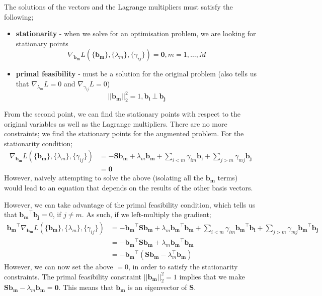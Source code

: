 \documentclass[a4paper, 12pt]{article}
\newcommand{\summation}[2]{\sum\limits_{#1}^{#2}}
\newcommand{\mat}[1]{\boldsymbol{#1}}
\renewcommand{\vec}[1]{\boldsymbol{#1}}
\begin{document}
            The solutions of the vectors and the Lagrange multipliers must satisfy the following;
            \begin{itemize}
                \itemsep0em
                \item \textbf{stationarity} - when we solve for an optimisation problem, we are looking for stationary points
                    $$\nabla_{\vec{b_m}} L(\{ \vec{b_m} \}, \{ \lambda_m \}, \{ \gamma_{ij} \}) = \vec{0}, m = 1, \dots, M$$
                \item \textbf{primal feasibility} - must be a solution for the original problem (also tells us that $\nabla_{\lambda_m}L = 0$ and $\nabla_{\gamma_{ij}}L = 0$)
                    $$|| \vec{b_m} ||_2^2 = 1, \vec{b_i}\ \bot\ \vec{b_j}$$
            \end{itemize}
            From the second point, we can find the stationary points with respect to the original variables as well as the Lagrange multipliers.
            There are no more constraints; we find the stationary points for the augmented problem.
            For the stationarity condition;
            \begin{align*}
                \nabla_{\vec{b_m}} L(\{ \vec{b_m} \}, \{ \lambda_m \}, \{ \gamma_{ij} \}) & = -\mat{S}\vec{b_m} + \lambda_m\vec{b_m} + \summation{i < m}{} \gamma_{im} \vec{b_i} + \summation{j > m}{} \gamma_{mj} \vec{b_j} \\
                & = \vec{0}
            \end{align*}
            However, naively attempting to solve the above (isolating all the $\vec{b_m}$ terms) would lead to an equation that depends on the results of the other basis vectors.
            \medskip

            However, we can take advantage of the primal feasibility condition, which tells us that $\vec{b_m}^\top\vec{b_j} = 0$, if $j \neq m$.
            As such, if we left-multiply the gradient;
            \begin{align*}
                \vec{b_m}^\top \nabla_{\vec{b_m}} L(\{ \vec{b_m} \}, \{ \lambda_m \}, \{ \gamma_{ij} \}) & = -\vec{b_m}^\top\mat{S}\vec{b_m} + \lambda_m\vec{b_m}^\top\vec{b_m} + \summation{i < m}{} \gamma_{im} \vec{b_m}^\top\vec{b_i} + \summation{j > m}{} \gamma_{mj} \vec{b_m}^\top\vec{b_j} \\
                & = -\vec{b_m}^\top\mat{S}\vec{b_m} + \lambda_m\vec{b_m}^\top\vec{b_m} \\
                & = -\vec{b_m}^\top(\mat{S}\vec{b_m} - \lambda_m^\top\vec{b_m})
            \end{align*}
            However, we can now set the above $= 0$, in order to satisfy the stationarity constraints.
            The primal feasibility constraint $|| \vec{b_m} ||_2^2 = 1$ implies that we make $\mat{S}\vec{b_m} - \lambda_m\vec{b_m} = \vec{0}$.
            This means that $\vec{b_m}$ is an eigenvector of $\mat{S}$.
            \medskip
\end{document}
